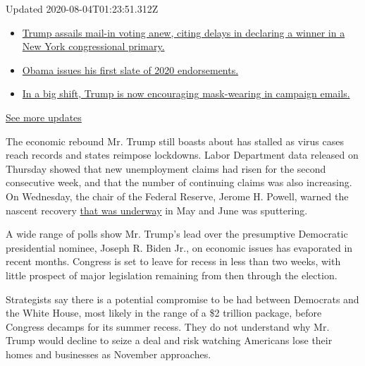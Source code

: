 Updated 2020-08-04T01:23:51.312Z

\begin{itemize}
\tightlist
\item
  \href{https://www.nytimes.com/2020/08/03/us/elections/biden-vs-trump.html?action=click\&pgtype=Article\&state=default\&region=MAIN_CONTENT_1\&context=storylines_live_updates\#link-6494b448}{Trump
  assails mail-in voting anew, citing delays in declaring a winner in a
  New York congressional primary.}
\item
  \href{https://www.nytimes.com/2020/08/03/us/elections/biden-vs-trump.html?action=click\&pgtype=Article\&state=default\&region=MAIN_CONTENT_1\&context=storylines_live_updates\#link-3de249e6}{Obama
  issues his first slate of 2020 endorsements.}
\item
  \href{https://www.nytimes.com/2020/08/03/us/elections/biden-vs-trump.html?action=click\&pgtype=Article\&state=default\&region=MAIN_CONTENT_1\&context=storylines_live_updates\#link-54e34d20}{In
  a big shift, Trump is now encouraging mask-wearing in campaign
  emails.}
\end{itemize}

\href{https://www.nytimes.com/2020/08/03/us/elections/biden-vs-trump.html?action=click\&pgtype=Article\&state=default\&region=MAIN_CONTENT_1\&context=storylines_live_updates}{See
more updates}

The economic rebound Mr. Trump still boasts about has stalled as virus
cases reach records and states reimpose lockdowns. Labor Department data
released on Thursday showed that new unemployment claims had risen for
the second consecutive week, and that the number of continuing claims
was also increasing. On Wednesday, the chair of the Federal Reserve,
Jerome H. Powell, warned the nascent recovery
\href{https://www.nytimes.com/2020/07/29/business/economy/federal-reserve-meeting-interest-rates.html}{that
was underway} in May and June was sputtering.

A wide range of polls show Mr. Trump's lead over the presumptive
Democratic presidential nominee, Joseph R. Biden Jr., on economic issues
has evaporated in recent months. Congress is set to leave for recess in
less than two weeks, with little prospect of major legislation remaining
from then through the election.

Strategists say there is a potential compromise to be had between
Democrats and the White House, most likely in the range of a \$2
trillion package, before Congress decamps for its summer recess. They do
not understand why Mr. Trump would decline to seize a deal and risk
watching Americans lose their homes and businesses as November
approaches.

